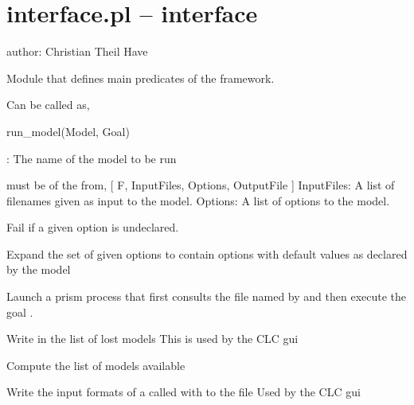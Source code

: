 


\section{interface.pl -- interface}

\label{sec:interface}

author: Christian Theil Have

Module that defines main predicates of the framework.\vspace{0.7cm}

\begin{description}
Can be called as,

\begin{code}
run_model(Model, Goal)
\end{code}

: The name of the model to be run

 must be of the from,  \Suniv{} [ F, InputFiles, Options, OutputFile ]
InputFiles: A list of filenames given as input to the model.
Options: A list of options to the model.

Fail if a given option is undeclared.

Expand the set of given options to contain options with default
values as declared by the model

Launch a prism process that first consults
the file named by  and then
execute the goal .


Write in  the list of lost models
This is used by the CLC gui

Compute the list of models available

Write the input formats of a  called with  to the file 
Used by the CLC gui 
\end{description}

